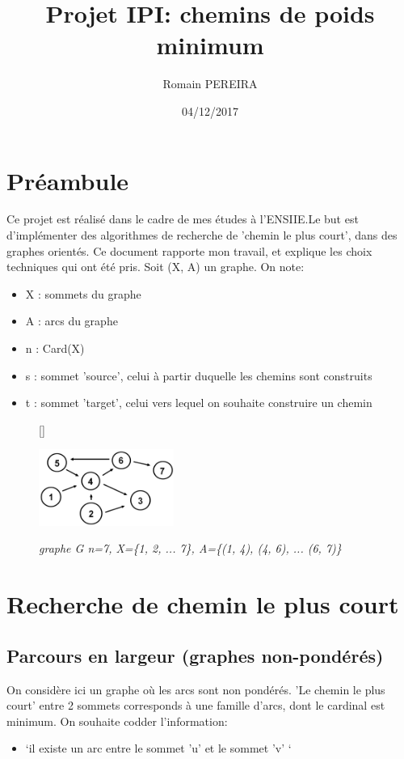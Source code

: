 \documentclass[10pt]{article}
\title{Projet IPI: chemins de poids minimum}
\author{Romain PEREIRA}
\date{04/12/2017}
\begin{document}
	\maketitle
	\tableofcontents

	\section*{Préambule}

		Ce projet est réalisé dans le cadre de mes études à l'ENSIIE.\newline Le but est d'implémenter des
		algorithmes de recherche de 'chemin le plus court', dans des graphes orientés.
		Ce document rapporte mon travail, et explique les choix techniques qui ont été pris.
		Soit (X, A) un graphe. On note:
		\begin{itemize}[label=-]
			\setlength\itemsep{0.1em}
			\item X : sommets du graphe
			\item A : arcs du graphe
			\item n : Card(X)
			\item s : sommet 'source', celui à partir duquelle les chemins sont construits
			\item t : sommet 'target', celui vers lequel on souhaite construire un chemin
		\end{itemize}

		\begin{figure}
			[\FBwidth]
			{\caption{\textit{\newline graphe G n=7, \newline X=\{1, 2, ... 7\}, \newline A=\{(1, 4), (4, 6), ... (6, 7)\}}}
			\label{graphe}}
			{\includegraphics[height=2.5cm]{./images/graph.png}}
		\end{figure}

	\newpage
	\section{Recherche de chemin le plus court}
		\subsection{Parcours en largeur (graphes non-pondérés)}
			On considère ici un graphe où les arcs sont non pondérés. 'Le chemin le plus court'
			entre 2 sommets corresponds à une famille d'arcs, dont le cardinal est minimum.
			On souhaite codder l'information:
			\begin{itemize}[label=-]
				\item `il existe un arc entre le sommet 'u' et le sommet 'v' `
			\end{itemize}
			
\end{document}
